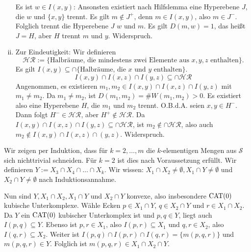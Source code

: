 \begin{beweis}
\begin{enumerate}[(i)]
\begin{minipage}{0.2\textwidth}
\begin{flushright}
			\end{flushright}
		\end{minipage}
		
		Es ist $w \in I(x,y)$:
		Ansonsten existiert nach Hilfslemma eine Hyperebene $J$, die $w$ und $\{x,y\}$ trennt.
		Es gilt $m \notin J^+$, denn $m \in I(x,y)$, also $m \in J^-$.
		Folglich trennt die Hyperebene $J$ $w$ und $m$.
		Es gilt $D(m,w) = 1$, das heißt $J = H$, aber $H$ trennt $m$ und $y$. Widerspruch.
		
		\item Zur Eindeutigkeit:
		Wir definieren
		\[
			\mathcal{HR} := \{\text{Halbräume, die mindestens zwei Elemente aus } x,y,z \text{ enthalten}\}.
		\]
		Es gilt $I(x,y) \subseteq \cap \{\text{Halbräume, die } x \text{ und } y \text{ enthalten}\}$.
		\[
			I(x,y) \cap I(x,z) \cap I(y,z) \subseteq \cap \mathcal{HR}
		\]
		Angenommen, es existieren $m_1,m_2 \in I(x,y) \cap I(x,z) \cap I(y,z)$ mit $m_1 \neq m_2$.
		Da $m_1 \neq m_2$, ist $D(m_1,m_2) = \#W(m_1,m_2) > 0$.
		Es existiert also eine Hyperebene $H$, die $m_1$ und $m_2$ trennt.
		O.B.d.A. seien $x,y \in H^-$.
		Dann folgt $H^- \in \mathcal{HR}$, aber $H^+ \notin \mathcal{HR}$.
		Da $I(x,y) \cap I(x,z) \cap I(y,z) \subseteq \cap \mathcal{HR}$, ist $m_2 \notin \cap \mathcal{HR}$, also auch $m_2 \notin I(x,y) \cap I(x,z) \cap(y,z)$.
		Widerspruch. \qedhere
	\end{enumerate}
\end{beweis}
\newpage
\begin{beweis}
	Wir zeigen per Induktion, dass für $k = 2, \dots, m$ die $k$-elementigen Mengen aus $\mathcal{S}$ sich nichttrivial schneiden.
	Für $k=2$ ist dies nach Voraussetzung erfüllt.
	Wir definieren $Y := X_3 \cap X_4 \cap \dots \cap X_k$.
	Wir wissen: $X_1 \cap  X_2 \neq \emptyset, X_1 \cap Y \neq \emptyset$ und $X_2 \cap Y \neq \emptyset$ nach Induktionsannahme.
	
	Nun sind $Y, X_1 \cap X_2, X_1 \cap Y$ und $X_2 \cap Y$ konvexe, also insbesondere $\operatorname{CAT(0)}$ kubische Unterkomplexe.
	Wähle Ecken $p \in X_1 \cap Y$, $q \in X_2 \cap Y$ und $r \in X_1 \cap X_2$.
	Da $Y$ ein $\operatorname{CAT(0)}$ kubischer Unterkomplex ist und $p,q \in Y$, liegt auch $I(p,q) \subseteq Y$.
	Ebenso ist $p,r \in X_1$, also $I(p,r) \subseteq X_1$ und $q,r \in X_2$, also $I(q,r) \subseteq X_2$.
	Weiter ist $I(p,q) \cap I(p,r) \cap I(q,r) = \{m(p,q,r)\}$ und $m(p,q,r) \in Y$.
	Folglich ist $m(p,q,r) \in X_1 \cap X_2 \cap Y$. \qedhere
\end{beweis}


